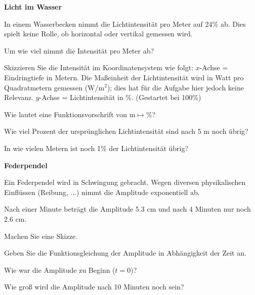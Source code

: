 

\bbwActAufgabenNr{} \textbf{Licht im Wasser}

In einem Wasserbecken nimmt die Lichtintensität pro Meter auf 24\% ab.
Dies spielt keine Rolle, ob horizontal oder vertikal gemessen wird.


\begin{bbwAufgabenBlock}

 \item Um wie viel nimmt die Intensität pro Meter ab? 
  
\item Skizzieren Sie die Intensität im Koordinatensystem wie folgt:
   $x$-Achse = Eindringtiefe in Metern. Die Maßeinheit der
   Lichtintensität wird in Watt pro Quadratmetern gemessen ($\textrm{W}/\textrm{m}^2$); dies
   hat für die Aufgabe hier jedoch keine Relevanz.
   $y$-Achse = Lichtintensität in \%. (Gestartet bei 100\%)
\item Wie lautet eine Funktionsvorschrift von $\textrm{m}\mapsto \%$?
\item Wie viel Prozent der ursprünglichen Lichtintensität sind nach 5
   m noch übrig? 

\item In wie vielen Metern ist noch 1\% der Lichtintensität übrig?
\end{bbwAufgabenBlock}
\platzFuerBerechnungenBisEndeSeite{}




\bbwActAufgabenNr{} \textbf{Federpendel}

Ein Federpendel wird in Schwingung gebracht. Wegen diversen
physikalischen Einflüssen (Reibung, ...) nimmt die Amplitude
exponentiell ab.

Nach einer Minute beträgt die Amplitude 5.3 cm und nach 4 Minuten nur noch
2.6 cm.

\begin{bbwAufgabenBlock}

\item Machen Sie eine Skizze.
\item Geben Sie die Funktionsgleichung der Amplitude in Abhängigkeit
der Zeit an.
      
\item Wie war die Amplitude zu Beginn ($t=0$)?

\item Wie groß wird die Amplitude nach 10 Minuten noch sein?
\end{bbwAufgabenBlock}
\platzFuerBerechnungenBisEndeSeite{}



